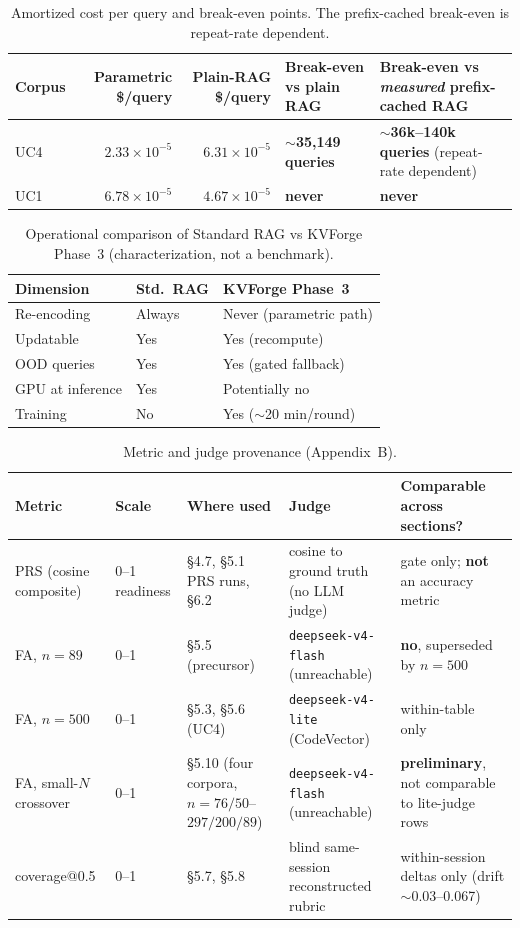 \begin{table}[!t]
\centering
\caption{Amortized cost per query and break-even points. The prefix-cached break-even is repeat-rate dependent.}
\label{tab:cost}
\small
\begin{tabularx}{\textwidth}{@{}l r r L L@{}}
\toprule
Corpus & Parametric \$/query & Plain-RAG \$/query & Break-even vs plain RAG & Break-even vs \emph{measured} prefix-cached RAG \\
\midrule
UC4 & $2.33\times10^{-5}$ & $6.31\times10^{-5}$ & \textbf{$\sim$35,149 queries} & \textbf{$\sim$36k--140k queries} (repeat-rate dependent) \\
UC1 & $6.78\times10^{-5}$ & $4.67\times10^{-5}$ & \textbf{never} & \textbf{never} \\
\bottomrule
\end{tabularx}
\end{table}

\begin{table}[!htbp]
\centering
\caption{Operational comparison of Standard RAG vs KVForge Phase~3 (characterization, not a benchmark).}
\label{tab:ops}
\small
\begin{tabularx}{\columnwidth}{@{}L l L@{}}
\toprule
Dimension & Std.\ RAG & KVForge Phase~3 \\
\midrule
Re-encoding & Always & Never (parametric path) \\
Updatable & Yes & Yes (recompute) \\
OOD queries & Yes & Yes (gated fallback) \\
GPU at inference & Yes & Potentially no \\
Training & No & Yes ($\sim$20 min/round) \\
\bottomrule
\end{tabularx}
\end{table}

\begin{table}[!t]
\centering
\caption{Metric and judge provenance (Appendix~B).}
\label{tab:provenance}
\small
\begin{tabularx}{\textwidth}{@{}L l L L L@{}}
\toprule
Metric & Scale & Where used & Judge & Comparable across sections? \\
\midrule
PRS (cosine composite) & 0--1 readiness & \S4.7, \S5.1 PRS runs, \S6.2 & cosine to ground truth (no LLM judge) & gate only; \textbf{not} an accuracy metric \\
FA, $n{=}89$ & 0--1 & \S5.5 (precursor) & \texttt{deepseek-v4-flash} (unreachable) & \textbf{no}, superseded by $n{=}500$ \\
FA, $n{=}500$ & 0--1 & \S5.3, \S5.6 (UC4) & \texttt{deepseek-v4-lite} (CodeVector) & within-table only \\
FA, small-$N$ crossover & 0--1 & \S5.10 (four corpora, $n{=}76/50$--$297/200/89$) & \texttt{deepseek-v4-flash} (unreachable) & \textbf{preliminary}, not comparable to lite-judge rows \\
coverage@0.5 & 0--1 & \S5.7, \S5.8 & blind same-session reconstructed rubric & within-session deltas only (drift $\sim$0.03--0.067) \\
\bottomrule
\end{tabularx}
\end{table}
